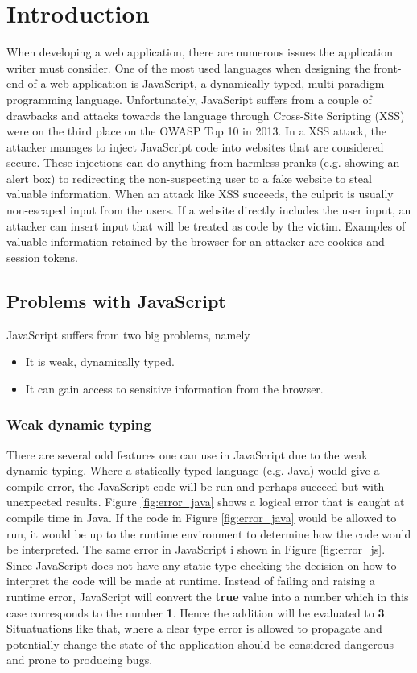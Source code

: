 \section{Introduction}
\label{chapter:intro}
When developing a web application, there are numerous issues the application writer must consider. One of the most used languages when designing the front-end of a web application is JavaScript\cite{javascript_popularity}, a dynamically typed, multi-paradigm programming language.\cite{javascript_info} Unfortunately, JavaScript suffers from a couple of drawbacks and attacks towards the language through Cross-Site Scripting (XSS) were on the third place on the OWASP Top 10 in 2013.\cite{owasp_xss_rank} In a XSS attack, the attacker manages to inject JavaScript code into websites that are considered secure.\cite{owasp_xss, excess_xss} These injections can do anything from harmless pranks (e.g. showing an alert box) to redirecting the non-suspecting user to a fake website to steal valuable information. When an attack like XSS succeeds, the culprit is usually non-escaped input from the users. If a website directly includes the user input, an attacker can insert input that will be treated as code by the victim.\cite{excess_xss} Examples of valuable information retained by the browser for an attacker are cookies and session tokens.
\subsection{Problems with JavaScript}
JavaScript suffers from two big problems, namely
\begin{itemize}
  \item It is weak, dynamically typed.
  \item It can gain access to sensitive information from the browser.
\end{itemize}
\subsubsection{Weak dynamic typing}
There are several odd features one can use in JavaScript due to the weak dynamic typing. Where a statically typed language (e.g. Java) would give a compile error, the JavaScript code will be run and perhaps succeed but with unexpected results. Figure \ref{fig:error_java} shows a logical error that is caught at compile time in Java. If the code in Figure \ref{fig:error_java} would be allowed to run, it would be up to the runtime environment to determine how the code would be interpreted. The same error in JavaScript i shown in Figure \ref{fig:error_js}. Since JavaScript does not have any static type checking the decision on how to interpret the code will be made at runtime. Instead of failing and raising a runtime error, JavaScript will convert the \textbf{true} value into a number which in this case corresponds to the number \textbf{1}. Hence the addition will be evaluated to \textbf{3}. Situatuations like that, where a clear type error is allowed to propagate and potentially change the state of the application should be considered dangerous and prone to producing bugs.

